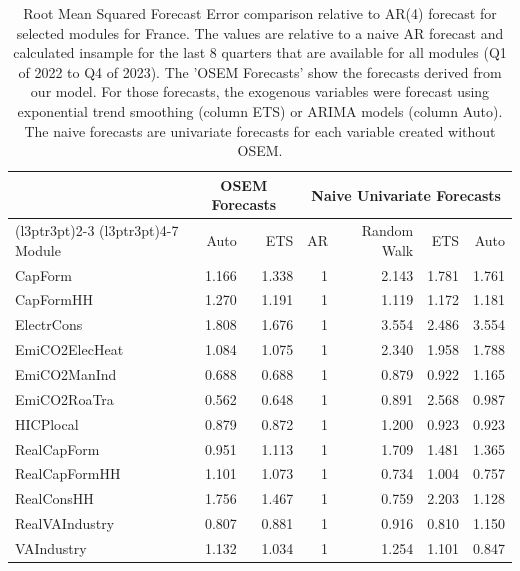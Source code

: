 
\begin{table}

\caption{\label{tab:rmsfe_FR}Root Mean Squared Forecast Error comparison relative to AR(4) forecast for selected modules for France. The values are relative to a naive AR forecast and calculated insample for the last 8 quarters that are available for all modules (Q1 of 2022 to Q4 of 2023). The 'OSEM Forecasts' show the forecasts derived from our model. For those forecasts, the exogenous variables were forecast using exponential trend smoothing (column ETS) or ARIMA models (column Auto). The naive forecasts are univariate forecasts for each variable created without OSEM.}
\centering
\begin{tabular}[t]{lrrrrrr}
\toprule
\multicolumn{1}{c}{ } & \multicolumn{2}{c}{OSEM Forecasts} & \multicolumn{4}{c}{Naive Univariate Forecasts} \\
\cmidrule(l{3pt}r{3pt}){2-3} \cmidrule(l{3pt}r{3pt}){4-7}
Module & Auto & ETS & AR & Random Walk & ETS & Auto\\
\midrule
CapForm & 1.166 & 1.338 & 1 & 2.143 & 1.781 & 1.761\\
CapFormHH & 1.270 & 1.191 & 1 & 1.119 & 1.172 & 1.181\\
ElectrCons & 1.808 & 1.676 & 1 & 3.554 & 2.486 & 3.554\\
EmiCO2ElecHeat & 1.084 & 1.075 & 1 & 2.340 & 1.958 & 1.788\\
EmiCO2ManInd & 0.688 & 0.688 & 1 & 0.879 & 0.922 & 1.165\\
\addlinespace
EmiCO2RoaTra & 0.562 & 0.648 & 1 & 0.891 & 2.568 & 0.987\\
HICPlocal & 0.879 & 0.872 & 1 & 1.200 & 0.923 & 0.923\\
RealCapForm & 0.951 & 1.113 & 1 & 1.709 & 1.481 & 1.365\\
RealCapFormHH & 1.101 & 1.073 & 1 & 0.734 & 1.004 & 0.757\\
RealConsHH & 1.756 & 1.467 & 1 & 0.759 & 2.203 & 1.128\\
\addlinespace
RealVAIndustry & 0.807 & 0.881 & 1 & 0.916 & 0.810 & 1.150\\
VAIndustry & 1.132 & 1.034 & 1 & 1.254 & 1.101 & 0.847\\
\bottomrule
\end{tabular}
\end{table}

